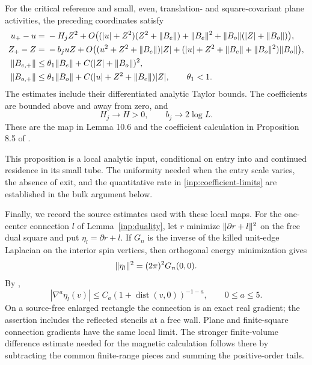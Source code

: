 \begin{proposition}\label{inp:balanced-map}
For the critical reference and small, even, translation- and
square-covariant plane activities, the preceding coordinates satisfy
\begin{align}\label{inp:parity-equations}
 u_+-u={}&-H_jZ^2+
 O\bigl((|u|+Z^2)(Z^2+\lVert B_e\rVert)+\lVert B_e\rVert^2
                    +\lVert B_o\rVert(|Z|+\lVert B_o\rVert)\bigr),\nonumber\\
 Z_+-Z={}&-b_juZ+
 O\bigl((u^2+Z^2+\lVert B_e\rVert)|Z|
       +( |u|+Z^2+\lVert B_e\rVert+\lVert B_o\rVert^2)\lVert B_o\rVert\bigr),\nonumber\\
 \lVert B_{e,+}\rVert\le{}&\theta_1\lVert B_e\rVert
                              +C(|Z|+\lVert B_o\rVert)^2,\nonumber\\
 \lVert B_{o,+}\rVert\le{}&\theta_1\lVert B_o\rVert
                       +C(|u|+Z^2+\lVert B_e\rVert)|Z|,
 \qquad \theta_1<1.
\end{align}
The estimates include their differentiated analytic Taylor bounds.
The coefficients are bounded above and away from zero, and
\begin{equation}\label{inp:coefficient-limits}
                         H_j\to H>0,\qquad b_j\to2\log L.
\end{equation}
These are the map in Lemma 10.6 and the coefficient
calculation in Proposition 8.5 of \cite{B}.
\end{proposition}

This proposition is a local analytic input, conditional on entry into
and continued residence in its small tube.  The uniformity needed
when the entry scale varies, the absence of exit, and the quantitative
rate in \eqref{inp:coefficient-limits} are established in the bulk
argument below.

Finally, we record the source estimates used with these local maps.
For the one-center connection \(l\) of Lemma~\ref{inp:duality},
let \(r\) minimize \(\lVert\partial r+l\rVert^2\) on the free dual
square and put \(\eta_l=\partial r+l\).  If \(G_n\) is the
inverse of the killed unit-edge Laplacian on the interior spin
vertices, then orthogonal energy minimization gives
\begin{equation}\label{inp:connection-energy}
                         \lVert\eta_l\rVert^2=(2\pi)^2G_n(0,0).
\end{equation}
By \cite[Lemmas 4.2 and 5.2]{B},
\begin{equation}\label{inp:source-lifts}
 |\nabla^a\eta_l(v)|\le C_a(1+\operatorname{dist}(v,0))^{-1-a},
                         \qquad 0\le a\le5.
\end{equation}
On a source-free enlarged rectangle the connection is an exact real
gradient; the assertion includes the reflected stencils at a free
wall.  Plane and finite-square connection gradients have the same
local limit.  The stronger finite-volume difference estimate needed
for the magnetic calculation follows there by subtracting the common
finite-range pieces and summing the positive-order tails.

